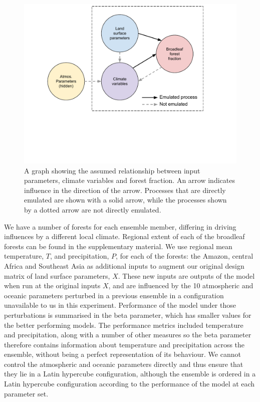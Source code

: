 \documentclass[gmd, manuscript]{copernicus}
\begin{document}
\begin{figure}[t]
\includegraphics[width=12cm]{../graphics/dag.pdf}
\caption{A graph showing the assumed relationship between input parameters, climate variables and forest fraction. An arrow indicates influence in the direction of the arrow. Processes that are directly emulated are shown with a solid arrow, while the processes shown by a dotted arrow are not directly emulated. 
}
\label{fig:dag}
\end{figure}

We have a number of forests for each ensemble member, differing in driving influences by a different local climate. Regional extent of each of the broadleaf forests can be found in the supplementary material. We use regional mean temperature, $T$, and precipitation, $P$, for each of the forests: the Amazon, central Africa and Southeast Asia as additional inputs to augment our original design matrix of land surface parameters, $X$. These new inputs are outputs of the model when run at the original inputs $X$, and are influenced by the 10 atmospheric and oceanic parameters perturbed in a previous ensemble in a configuration unavailable to us in this experiment. Performance of the model under those perturbations is summarised in the beta parameter, which has smaller values for the better performing models. The performance metrics included temperature and precipitation, along with a number of other measures so the beta parameter therefore contains information about temperature and precipitation across the ensemble, without being a perfect representation of its behaviour. We cannot control the atmospheric and oceanic parameters directly and thus ensure that they lie in a Latin hypercube configuration, although the ensemble is ordered in a Latin hypercube configuration according to the performance of the model at each parameter set. 
\end{document}
